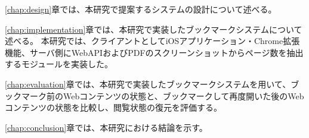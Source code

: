\ref{chap:design}章では、本研究で提案するシステムの設計について述べる。

\ref{chap:implementation}章では、本研究で実装したブックマークシステムについて述べる。
本研究では、クライアントとしてiOSアプリケーション・Chrome拡張機能、サーバ側にWebAPIおよびPDFのスクリーンショットからページ数を抽出するモジュールを実装した。

\ref{chap:evaluation}章では、本研究で実装したブックマークシステムを用いて、ブックマーク前のWebコンテンツの状態と、ブックマークして再度開いた後のWebコンテンツの状態を比較し、閲覧状態の復元を評価する。

\ref{chap:conclusion}章では、本研究における結論を示す。